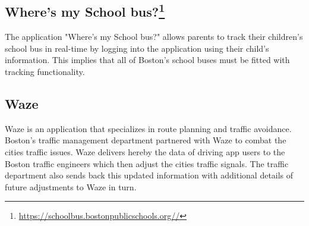 \documentclass[a4paper,12pt]{report}
\begin{document}
		\subsection[Where's my School bus?]{Where's my School bus?\footnote{\url{https://schoolbus.bostonpublicschools.org//}}}
		\startsubsection
			The application "Where's my School bus?" allows parents to track their children's school bus in real-time by logging into the application using their child's information. 
			This implies that all of Boston's school buses must be fitted with tracking functionality.
		\closesection		
		
		\subsection[Waze]{Waze \cite{InformationSuperhighway}}
		\startsubsection
			Waze is an application that specializes in route planning and traffic avoidance.
			Boston's traffic management department partnered with Waze to combat the cities traffic issues. 
			Waze delivers hereby the data of driving app users to the Boston traffic engineers which then adjust the cities traffic signals. 
			The traffic department also sends back this updated information with additional details of future adjustments to Waze in turn.
		\closesection
		
\end{document}
